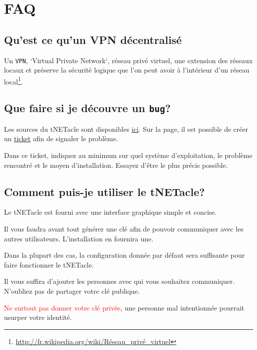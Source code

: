 \section{FAQ}
\subsection{Qu'est ce qu'un VPN décentralisé}
Un \texttt{VPN}, `Virtual Private Network`, réseau privé virtuel,
une extension des réseaux locaux et préserve la sécurité logique que
l'on peut avoir à l'intérieur d'un réseau local\footnote{\url{http://fr.wikipedia.org/wiki/Réseau\_privé\_virtuel}}.

\subsection{Que faire si je découvre un \texttt{bug}?}

Les sources du tNETacle sont disponibles \href{https://github.com/LaKabane/tNETacle}{ici}.
Sur la page, il est possible de créer un \href{https://github.com/LaKabane/tNETacle/issues/new}{ticket}
afin de signaler le problème.

Dans ce ticket, indiquez au minimum sur quel système d'exploitation, le problème rencontré et le moyen d'installation.
Essayez d'être le plus précis possible.

\subsection{Comment puis-je utiliser le tNETacle?}
Le tNETacle est fourni avec une interface graphique simple et concise.

Il vous faudra avant tout générer une clé afin de pouvoir communiquer avec les autres utilisateurs.
L'installation en fournira une. 

Dans la plupart des cas, la configuration donnée par défaut sera suffisante pour faire fonctionner le tNETacle.

Il vous suffira d'ajouter les personnes avec qui vous souhaitez communiquer. N'oubliez pas de partager votre clé publique.

\textcolor{red}{Ne surtout pas donner votre clé privée}, une personne mal intentionnée pourrait usurper votre identité.

